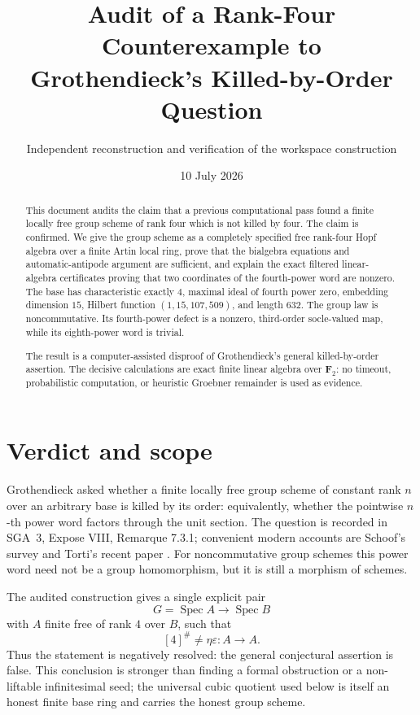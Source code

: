 \documentclass[11pt]{article}
\title{Audit of a Rank-Four Counterexample to\\
Grothendieck's Killed-by-Order Question}
\author{Independent reconstruction and verification of the workspace construction}
\date{10 July 2026}
\theoremstyle{remark}
\newcommand{\F}{\mathbf F}
\newcommand{\Spec}{\operatorname{Spec}}
\newcommand{\eps}{\varepsilon}
\begin{document}
\maketitle

\begin{abstract}
This document audits the claim that a previous computational pass found a
finite locally free group scheme of rank four which is not killed by four.
The claim is confirmed.  We give the group scheme as a completely specified
free rank-four Hopf algebra over a finite Artin local ring, prove that the
bialgebra equations and automatic-antipode argument are sufficient, and
explain the exact filtered linear-algebra certificates proving that two
coordinates of the fourth-power word are nonzero.  The base has
characteristic exactly \(4\), maximal ideal of fourth power zero, embedding
dimension \(15\), Hilbert function \((1,15,107,509)\), and length \(632\).
The group law is noncommutative.  Its fourth-power defect is a nonzero,
third-order socle-valued map, while its eighth-power word is trivial.

The result is a computer-assisted disproof of Grothendieck's general
killed-by-order assertion.  The decisive calculations are exact finite
linear algebra over \(\F_2\): no timeout, probabilistic computation, or
heuristic Groebner remainder is used as evidence.
\end{abstract}

\tableofcontents

\section{Verdict and scope}

Grothendieck asked whether a finite locally free group scheme of constant
rank \(n\) over an arbitrary base is killed by its order: equivalently,
whether the pointwise \(n\)-th power word factors through the unit section.
The question is recorded in SGA~3, Expose VIII, Remarque 7.3.1; convenient
modern accounts are Schoof's survey and Torti's recent paper
\cite{SGA3,SchoofSurvey,Torti}.  For noncommutative group schemes this power
word need not be a group homomorphism, but it is still a morphism of schemes.

The audited construction gives a single explicit pair
\[
  G=\Spec A \longrightarrow \Spec B
\]
with \(A\) finite free of rank \(4\) over \(B\), such that
\[
  [4]^\#\ne\eta\eps:A\longrightarrow A.
\]
Thus the statement is negatively resolved: the general conjectural assertion
is false.  This conclusion is stronger than finding a formal obstruction or
a non-liftable infinitesimal seed; the universal cubic quotient used below is
itself an honest finite base ring and carries the honest group scheme.
\end{document}
